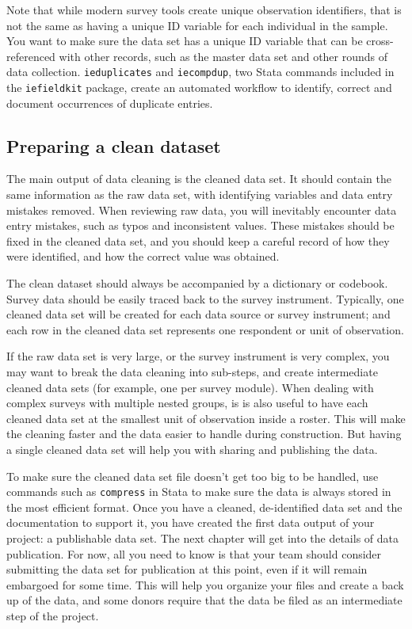 Note that while modern survey tools create unique observation identifiers,
that is not the same as having a unique ID variable for each individual in the sample.
You want to make sure the data set has a unique ID variable
that can be cross-referenced with other records, such as the master data set
and other rounds of data collection.
\texttt{ieduplicates} and \texttt{iecompdup},
two Stata commands included in the \texttt{iefieldkit}
package,
create an automated workflow to identify, correct and document
occurrences of duplicate entries.

\subsection{Preparing a clean dataset}
The main output of data cleaning is the cleaned data set.
It should contain the same information as the raw data set,
with identifying variables and data entry mistakes removed.
When reviewing raw data, you will inevitably encounter data entry mistakes,
such as typos and inconsistent values.
These mistakes should be fixed in the cleaned data set,
and you should keep a careful record of how they were identified,
and how the correct value was obtained.

The clean dataset should always be accompanied by a dictionary or codebook.
Survey data should be easily traced back to the survey instrument. 
Typically, one cleaned data set will be created for each data source
or survey instrument; and each row in the cleaned data set represents one 
respondent or unit of observation.\cite{tidy-data}

If the raw data set is very large, or the survey instrument is very complex,
you may want to break the data cleaning into sub-steps,
and create intermediate cleaned data sets
(for example, one per survey module).
When dealing with complex surveys with multiple nested groups,
is is also useful to have each cleaned data set at the smallest unit of observation inside a roster.
This will make the cleaning faster and the data easier to handle during construction.
But having a single cleaned data set will help you with sharing and publishing the data.

To make sure the cleaned data set file doesn't get too big to be handled,
use commands such as \texttt{compress} in Stata to make sure the data
is always stored in the most efficient format.
Once you have a cleaned, de-identified data set and the documentation to support it,
you have created the first data output of your project:
a publishable data set.
The next chapter will get into the details of data publication.
For now, all you need to know is that your team should consider submitting the data set for publication at this point,
even if it will remain embargoed for some time.
This will help you organize your files and create a back up of the data,
and some donors require that the data be filed as an intermediate step of the project.


